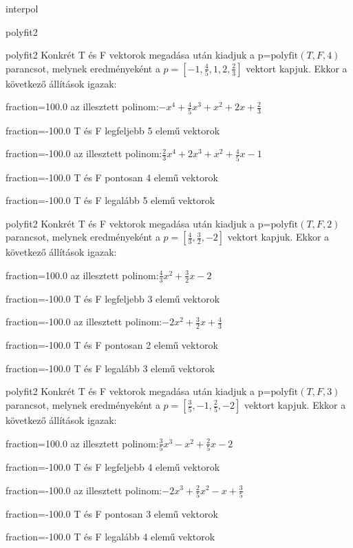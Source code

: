 \documentclass[12pt]{article}
\begin{document}
\begin{quiz}{interpol}
\begin{multi}[multiple]{polyfit2}
\end{multi}
\begin{multi}[multiple]{polyfit2}
Konkrét T és F vektorok megadása után kiadjuk a p=$\mathrm{polyfit}(T,F,4)$
parancsot, melynek eredményeként a $p=\left[-1,\frac{4}{5},1,2,\frac{2}{3}\right]$ vektort kapjuk.
Ekkor a következő állítások igazak:
\item[fraction=100.0] az illesztett polinom:$-x^4+\frac{4}{5}x^3+x^2+2x+\frac{2}{3}$
\item[fraction=-100.0]  T és F legfeljebb 5 elemű vektorok
\item[fraction=-100.0]  az illesztett polinom:$\frac{2}{3}x^4+2x^3+x^2+\frac{4}{5}x-1$
\item[fraction=-100.0]  T és F pontosan 4 elemű vektorok
\item[fraction=-100.0] T és F legalább 5 elemű vektorok
\end{multi}
\begin{multi}[multiple]{polyfit2}
Konkrét T és F vektorok megadása után kiadjuk a p=$\mathrm{polyfit}(T,F,2)$
parancsot, melynek eredményeként a $p=\left[\frac{4}{3},\frac{3}{2},-2\right]$ vektort kapjuk.
Ekkor a következő állítások igazak:
\item[fraction=100.0] az illesztett polinom:$\frac{4}{3}x^2+\frac{3}{2}x-2$
\item[fraction=-100.0]  T és F legfeljebb 3 elemű vektorok
\item[fraction=-100.0]  az illesztett polinom:$-2x^2+\frac{3}{2}x+\frac{4}{3}$
\item[fraction=-100.0]  T és F pontosan 2 elemű vektorok
\item[fraction=-100.0] T és F legalább 3 elemű vektorok
\end{multi}
\begin{multi}[multiple]{polyfit2}
Konkrét T és F vektorok megadása után kiadjuk a p=$\mathrm{polyfit}(T,F,3)$
parancsot, melynek eredményeként a $p=\left[\frac{3}{5},-1,\frac{2}{5},-2\right]$ vektort kapjuk.
Ekkor a következő állítások igazak:
\item[fraction=100.0] az illesztett polinom:$\frac{3}{5}x^3-x^2+\frac{2}{5}x-2$
\item[fraction=-100.0]  T és F legfeljebb 4 elemű vektorok
\item[fraction=-100.0]  az illesztett polinom:$-2x^3+\frac{2}{5}x^2-x+\frac{3}{5}$
\item[fraction=-100.0]  T és F pontosan 3 elemű vektorok
\item[fraction=-100.0] T és F legalább 4 elemű vektorok

\end{multi}
\end{quiz}
\end{document}
